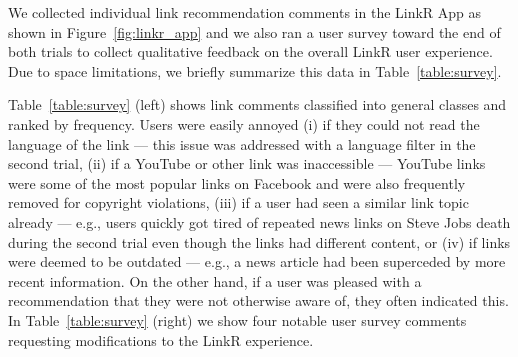 %
We collected individual link recommendation comments in the LinkR App
as shown in Figure~\ref{fig:linkr_app} and we also ran a user survey
toward the end of both trials to collect qualitative feedback on the
overall LinkR user experience.  Due to space limitations, we 
briefly summarize this data in Table~\ref{table:survey}.

Table~\ref{table:survey} (left) shows link comments classified
into general classes and ranked by frequency.  Users were easily
annoyed (i) if they could not read the language of the link --- 
this issue was addressed with a language filter in the second trial, (ii) if a
YouTube or other link was inaccessible --- YouTube links were some of the most
popular links on Facebook and were also frequently removed for
copyright violations, (iii) if a user had seen a similar link topic already ---
e.g., users quickly got tired of repeated news links on Steve Jobs
death during the second trial even though the links had
different content, or (iv) if links were deemed to be outdated ---
e.g., a news article had been superceded by more recent information.
On the other hand, if a user was pleased with a recommendation that
they were not otherwise aware of, they often indicated this.  In
Table~\ref{table:survey} (right) we show four notable user survey
comments requesting modifications to the LinkR experience.

